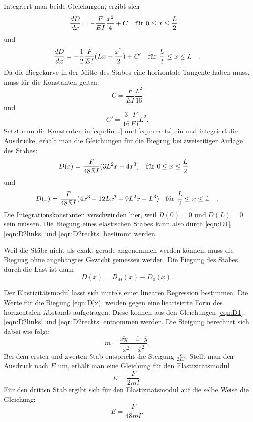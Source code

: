 Integriert man beide Gleichungen, ergibt sich 
\begin{equation*}
\frac{dD}{dx} = - \frac{F}{EI} \frac{x^2}{4} + C \qq{für $0 \leq x \leq \frac{L}{2}$}
\end{equation*}
und
\begin{equation*}
\frac{dD}{dx} = - \frac{1}{2} \frac{F}{EI} (Lx-\frac{x^2}{2}) + C' \qq{für $\frac{L}{2} \leq x \leq L$}.
\end{equation*}
Da die Biegekurve in der Mitte des Stabes eine horizontale Tangente
haben muss, muss für die Konstanten gelten:
\begin{equation*}
C = \frac{F}{EI} \frac{L^2}{16}
\end{equation*}
und
\begin{equation*}
C' = \frac{3}{16} \frac{F}{EI} L^2.
\end{equation*}
Setzt man die Konstanten in \eqref{eqn:links} und \eqref{eqn:rechts}
ein und integriert die Ausdrücke, erhält man die Gleichungen
für die Biegung bei zweiseitiger Auflage des Stabes:
\begin{equation}
D(x) = \frac{F}{48EI} (3L^2x - 4x^3) \qq{für $0 \leq x \leq \frac{L}{2}$}
\label{eqn:D2links}
\end{equation}
und
\begin{equation}
D(x) = \frac{F}{48EI} (4x^3 - 12Lx^2 + 9L^2x - L^3) \qq{für $\frac{L}{2} \leq x \leq L$}.
\label{eqn:D2rechts}
\end{equation}
Die Integrationskonstanten verschwinden hier, weil $D(0) = 0$ und $D(L) = 0$ sein müssen.
Die Biegung eines elastischen Stabes kann also durch
\eqref{eqn:D1}, \eqref{eqn:D2links} und \eqref{eqn:D2rechts} bestimmt werden.

\noindent Weil die Stäbe nicht als exakt gerade angenommen werden können,
muss die Biegung ohne angehängtes Gewicht gemessen werden.
Die Biegung des Stabes durch die Last ist dann 
\begin{equation}
D(x) = D_{M}(x) - D_{0}(x).
\label{eqn:D(x)}
\end{equation}

\noindent Der Elastizitätsmodul lässt sich mittels einer
linearen Regression bestimmen. Die Werte für die Biegung \eqref{eqn:D(x)}
werden gegen eine liearisierte Form des horizontalen Abstands aufgetragen.
Diese können aus den Gleichungen \eqref{eqn:D1}, \eqref{eqn:D2links} und \eqref{eqn:D2rechts} entnommen werden.
Die Steigung berechnet sich dabei wie folgt:
\begin{equation}
m = \frac{\overline{xy} - \overline{x} \cdot \overline{y}}{\overline{x^2} - \overline{x}^2}.
\label{eqn:m}
\end{equation} %
Bei dem ersten und zweiten Stab entspricht die Steigung
$\frac{F}{2EI}$.
Stellt man den Ausdruck nach $E$ um, erhält man
eine Gleichung für den Elastizitätsmodul:
\begin{equation}
E = \frac{F}{2mI}.
\label{eqn:E12}
\end{equation}
Für den dritten Stab ergibt sich für den Elastizitätsmodul auf die
selbe Weise die Gleichung:
\begin{equation}
E = \frac{F}{48mI}.
\label{eqn:E3}
\end{equation}

